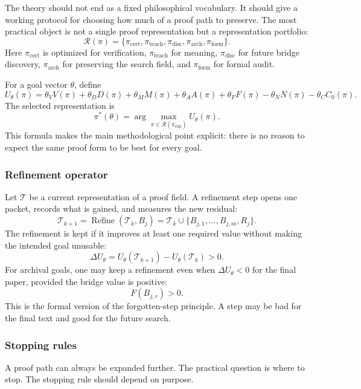 \documentclass[11pt]{article}
\theoremstyle{definition}
\theoremstyle{remark}
\begin{document}
The theory should not end as a fixed philosophical vocabulary.  It should give a working protocol for choosing how much of a proof path to preserve.  The most practical object is not a single proof representation but a representation portfolio:
\[
        \mathcal R(\pi)=
        \{\pi_{\mathrm{cert}},\pi_{\mathrm{teach}},\pi_{\mathrm{disc}},\pi_{\mathrm{arch}},\pi_{\mathrm{form}}\}.
\]
Here $\pi_{\mathrm{cert}}$ is optimized for verification, $\pi_{\mathrm{teach}}$ for meaning, $\pi_{\mathrm{disc}}$ for future bridge discovery, $\pi_{\mathrm{arch}}$ for preserving the search field, and $\pi_{\mathrm{form}}$ for formal audit.

For a goal vector $\theta$, define
\[
        U_\theta(\pi)
        =\theta_VV(\pi)+\theta_DD(\pi)+\theta_MM(\pi)+\theta_AA(\pi)+\theta_FF(\pi)
        -\theta_NN(\pi)-\theta_CC_0(\pi).
\]
The selected representation is
\[
        \pi^*(\theta)=\arg\max_{\pi\in\mathcal R(\pi_{\mathrm{exp}})}U_\theta(\pi).
\]
This formula makes the main methodological point explicit: there is no reason to expect the same proof form to be best for every goal.

\subsubsection{Refinement operator}

Let $\mathcal T$ be a current representation of a proof field.  A refinement step opens one packet, records what is gained, and measures the new residual:
\[
        \mathcal T_{k+1}=\operatorname{Refine}(\mathcal T_k,B_j)
        =\mathcal T_k\cup\{B_{j,1},\ldots,B_{j,m},R_j\}.
\]
The refinement is kept if it improves at least one required value without making the intended goal unusable:
\[
        \Delta U_\theta
        =U_\theta(\mathcal T_{k+1})-U_\theta(\mathcal T_k)>0.
\]
For archival goals, one may keep a refinement even when $\Delta U_\theta<0$ for the final paper, provided the bridge value is positive:
\[
        F(B_{j,r})>0.
\]
This is the formal version of the forgotten-step principle.  A step may be bad for the final text and good for the future search.

\subsubsection{Stopping rules}

A proof path can always be expanded further.  The practical question is where to stop.  The stopping rule should depend on purpose.
\end{document}
